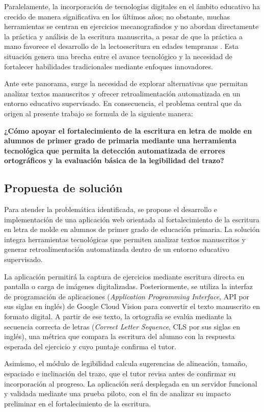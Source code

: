 Paralelamente, la incorporación de tecnologías digitales en el ámbito educativo ha crecido de manera significativa en los últimos años; no obstante, muchas herramientas se centran en ejercicios mecanografiados y no abordan directamente la práctica y análisis de la escritura manuscrita, a pesar de que la práctica a mano favorece el desarrollo de la lectoescritura en edades tempranas \cite{james2012effects}. Esta situación genera una brecha entre el avance tecnológico y la necesidad de fortalecer habilidades tradicionales mediante enfoques innovadores.

Ante este panorama, surge la necesidad de explorar alternativas que permitan analizar textos manuscritos y ofrecer retroalimentación automatizada en un entorno educativo supervisado. En consecuencia, el problema central que da origen al presente trabajo se formula de la siguiente manera:

\textbf{¿Cómo apoyar el fortalecimiento de la escritura en letra de molde en alumnos de primer grado de primaria mediante una herramienta tecnológica que permita la detección automatizada de errores ortográficos y la evaluación básica de la legibilidad del trazo?
}

\subsection{Propuesta de solución}
Para atender la problemática identificada, se propone el desarrollo e implementación de una aplicación web orientada al fortalecimiento de la escritura en letra de molde en alumnos de primer grado de educación primaria. La solución integra herramientas tecnológicas que permiten analizar textos manuscritos y generar retroalimentación automatizada dentro de un entorno educativo supervisado.

La aplicación permitirá la captura de ejercicios mediante escritura directa en pantalla o carga de imágenes digitalizadas. Posteriormente, se utiliza la interfaz de programación de aplicaciones (\textit{Application Programming Interface}, API por sus siglas en inglés) de Google Cloud Vision para convertir el texto manuscrito en formato digital. A partir de ese texto, la ortografía se evalúa mediante la secuencia correcta de letras (\textit{Correct Letter Sequence}, CLS por sus siglas en inglés), una métrica que compara la escritura del alumno con la respuesta esperada del ejercicio y cuyo puntaje confirma el tutor.

Asimismo, el módulo de legibilidad calcula sugerencias de alineación, tamaño, espaciado e inclinación del trazo, que el tutor revisa antes de confirmar su incorporación al progreso. La aplicación será desplegada en un servidor funcional y validada mediante una prueba piloto, con el fin de analizar su impacto preliminar en el fortalecimiento de la escritura.

